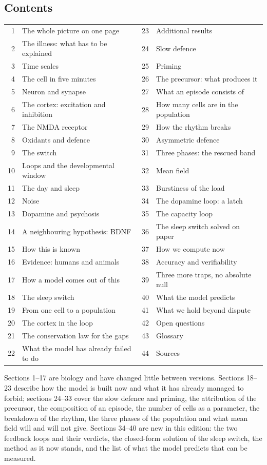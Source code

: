 \documentclass[11pt,a4paper,landscape,twocolumn]{article}
\begin{document}
\subsection{Contents}
{\small
\begin{tabular}{@{}r@{\ \ }l@{\quad}r@{\ \ }l@{}}
1 & The whole picture on one page & 23 & Additional results\\
2 & The illness: what has to be explained & 24 & Slow defence\\
3 & Time scales & 25 & Priming\\
4 & The cell in five minutes & 26 & The precursor: what produces it\\
5 & Neuron and synapse & 27 & What an episode consists of\\
6 & The cortex: excitation and inhibition & 28 & How many cells are in the population\\
7 & The NMDA receptor & 29 & How the rhythm breaks\\
8 & Oxidants and defence & 30 & Asymmetric defence\\
9 & The switch & 31 & Three phases: the rescued band\\
10 & Loops and the developmental window & 32 & Mean field\\
11 & The day and sleep & 33 & Burstiness of the load\\
12 & Noise & 34 & The dopamine loop: a latch\\
13 & Dopamine and psychosis & 35 & The capacity loop\\
14 & A neighbouring hypothesis: BDNF & 36 & The sleep switch solved on paper\\
15 & How this is known & 37 & How we compute now\\
16 & Evidence: humans and animals & 38 & Accuracy and verifiability\\
17 & How a model comes out of this & 39 & Three more traps, no absolute null\\
18 & The sleep switch & 40 & What the model predicts\\
19 & From one cell to a population & 41 & What we hold beyond dispute\\
20 & The cortex in the loop & 42 & Open questions\\
21 & The conservation law for the gaps & 43 & Glossary\\
22 & What the model has already failed to do & 44 & Sources\\
\end{tabular}}

Sections 1--17 are biology and have changed little between versions. Sections 18--23 describe how the model is built now and what it has already managed to forbid; sections 24--33 cover the slow defence and priming, the attribution of the precursor, the composition of an episode, the number of cells as a parameter, the breakdown of the rhythm, the three phases of the population and what mean field will and will not give. Sections 34--40 are new in this edition: the two feedback loops and their verdicts, the closed-form solution of the sleep switch, the method as it now stands, and the list of what the model predicts that can be measured.
\end{document}
